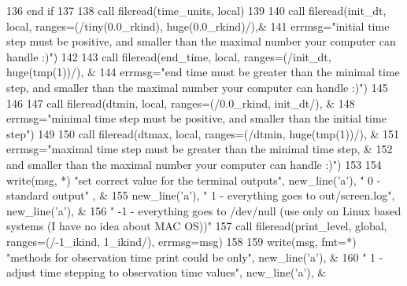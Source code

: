 \begin{DoxyCode}
136 \textcolor{keywordflow}{      end if}
137       
138       \textcolor{keyword}{call }fileread(time_units, local)
139       
140       \textcolor{keyword}{call }fileread(init_dt, local, ranges=(/tiny(0.0\_rkind), huge(0.0\_rkind\textcolor{comment}{)/),&}
141 \textcolor{comment}{      errmsg=}\textcolor{stringliteral}{"initial time step must be positive, and smaller than the maximal number your computer can
       handle :)"}\textcolor{comment}{)}
142 \textcolor{comment}{      }
143 \textcolor{comment}{      }\textcolor{keyword}{call }fileread(end_time, local, ranges=(/init_dt, huge(tmp(1))/), &
144       errmsg=\textcolor{stringliteral}{"end time must be greater than the minimal time step, and smaller than the maximal number your
       computer can handle :)"}\textcolor{comment}{)}
145 \textcolor{comment}{      }
146 \textcolor{comment}{      }
147 \textcolor{comment}{      }\textcolor{keyword}{call }fileread(dtmin, local, ranges=(/0.0\_rkind, init_dt/), &
148       errmsg=\textcolor{stringliteral}{"minimal time step must be positive, and smaller than the initial time step"}\textcolor{comment}{)}
149 \textcolor{comment}{      }
150 \textcolor{comment}{      }\textcolor{keyword}{call }fileread(dtmax, local, ranges=(/dtmin, huge(tmp(1))/), &
151       errmsg=\textcolor{stringliteral}{"maximal time step must be greater than the minimal time step, &}
152 \textcolor{stringliteral}{}\textcolor{stringliteral}{                and smaller than the maximal number your computer can handle :)"})
153       
154       \textcolor{keyword}{write}(msg, *) \textcolor{stringliteral}{"set correct value for the terminal outputs"}, new\_line\textcolor{comment}{(}\textcolor{stringliteral}{'a'}\textcolor{comment}{), }\textcolor{stringliteral}{"     0 - standard output"}\textcolor{comment}{
      , &}
155 \textcolor{comment}{        new\_line(}\textcolor{stringliteral}{'a'}),  \textcolor{stringliteral}{"     1 - everything goes to out/screen.log"}, new\_line(\textcolor{stringliteral}{'a'}\textcolor{comment}{), &}
156 \textcolor{comment}{        }\textcolor{stringliteral}{"    -1 - everything goes to /dev/null (use only on Linux based systems (I have no idea about MAC
       OS))"}
157       \textcolor{keyword}{call }fileread(print_level, global, ranges=(/-1\_ikind, 1\_ikind/), errmsg\textcolor{comment}{=msg)}
158 \textcolor{comment}{      }
159 \textcolor{comment}{      }\textcolor{keyword}{write}(msg, fmt=*) \textcolor{stringliteral}{"methods for observation time print could be only"}\textcolor{comment}{, new\_line(}\textcolor{stringliteral}{'a'}\textcolor{comment}{), &}
160 \textcolor{comment}{        }\textcolor{stringliteral}{"       1 - adjust time stepping to observation time values"},  new\_line(\textcolor{stringliteral}{'a'}),\textcolor{comment}{ &}

\end{DoxyCode}
